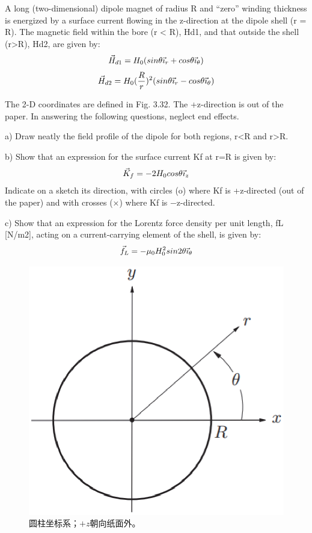 A long (two-dimensional) dipole magnet of radius R and “zero” winding thickness
is energized by a surface current flowing in the z-direction at the dipole shell
(r = R). The magnetic field within the bore (r < R), Hd1, and that outside the
shell (r>R), Hd2, are given by:
$$
\vec{H}_{d1}=H_{0}(sin\theta\vec{\imath}_{r}+cos\theta\vec{\imath}_{\theta})\\%
$$
$$
\vec{H}_{d2}=H_{0}(\frac{R}{r})^2(sin\theta\vec{\imath}_{r}-cos\theta\vec{\imath}_{\theta})\\%
$$

The 2-D coordinates are defined in Fig. 3.32. The +z-direction is out of the paper.
In answering the following questions, neglect end effects.

a) Draw neatly the field profile of the dipole for both regions, r<R and r>R.

b) Show that an expression for the surface current Kf at r=R is given by:
$$
\vec{K}_{f}=-2H_{0}cos\theta\vec{\imath}_{z}\\%
$$
Indicate on a sketch its direction, with circles (o) where Kf is +z-directed
(out of the paper) and with crosses (×) where Kf is −z-directed.

c) Show that an expression for the Lorentz force density per unit length, fL
[N/m2], acting on a current-carrying element of the shell, is given by:
$$
\vec{f}_{L}=-\mu_{0}H_{0}^{2}sin2\theta\vec{\imath}_{\theta}\\%
$$
\begin{figure}[htbp]
	\centering
	\includegraphics[scale=0.5]{chpt3/figs/fig3.32.eps}
	\caption{圆柱坐标系；$+z$朝向纸面外。}
\end{figure}

